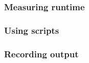 \documentclass[12pt]{article}
\begin{document}
\subsubsection{Measuring runtime}
\subsubsection{Using scripts}
\subsubsection{Recording output}

\printbibliography
\end{document}
